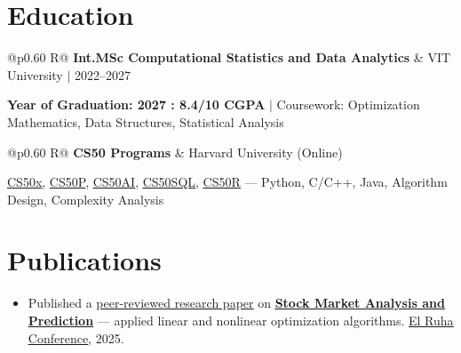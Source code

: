 \documentclass[a4paper,10pt]{article}
\newcommand{\ulink}[2]{\href{#1}{\uline{#2}}}
\newcommand{\subheading}[1]{{\color[HTML]{0A0A0A}\fontsize{12}{14}\selectfont\bfseries #1}}
\newcommand{\meta}[1]{{\color[HTML]{5C5C5C}\fontsize{10.5}{12.5}\selectfont #1}}
\begin{document}
\vspace{2pt}

\section{Education}
\vspace{2pt}

\begin{tabularx}{\linewidth}{@{}p{0.60\linewidth} R@{}}
\subheading{Int.MSc Computational Statistics and Data Analytics} & \meta{VIT University $|$ 2022--2027}
\end{tabularx}
\vspace{1pt}
{\color[HTML]{3A3A3A}\fontsize{11}{14}\selectfont \textbf{Year of Graduation: 2027 : 8.4/10 CGPA} $|$ Coursework: Optimization Mathematics, Data Structures, Statistical Analysis}

\begin{tabularx}{\linewidth}{@{}p{0.60\linewidth} R@{}}
\subheading{CS50 Programs} & \meta{Harvard University (Online)}
\end{tabularx}
\vspace{1pt}
{\color[HTML]{3A3A3A}\fontsize{11}{14}\selectfont \ulink{https://cs50.harvard.edu/certificates/b14b78df-e05c-413e-a607-1dd27303053a}{CS50x}, \ulink{https://cs50.harvard.edu/certificates/32477052-9db4-49c4-a5a4-d7e58429ca2c}{CS50P}, \ulink{https://cs50.harvard.edu/certificates/9cdb4d4a-1250-4f8e-9fd7-191864e0f919}{CS50AI}, \ulink{https://cs50.harvard.edu/certificates/bc486f24-f085-4e61-8536-80940b97a1b9}{CS50SQL}, \ulink{https://cs50.harvard.edu/certificates/666838e6-a053-4d82-b179-a60fe745fd84}{CS50R} --- Python, C/C++, Java, Algorithm Design, Complexity Analysis}

\vspace{2pt}

\section{Publications}
\vspace{2pt}
\begin{itemize}[nosep, leftmargin=1.5em, itemsep=1pt, topsep=2pt]
  \item {\color[HTML]{0A0A0A}\fontsize{11}{14}\selectfont
  Published a \ulink{https://www.elruha.org/_files/ugd/614b1f_6b95e1b697bf452b9907ba46e0151c05.pdf\#page=774}{peer-reviewed research paper} on \ulink{https://github.com/su-jin1425/Set-Project}{\textbf{Stock Market Analysis and Prediction}} --- applied linear and nonlinear optimization algorithms. \ulink{https://www.elruha.org/congress-books}{El Ruha Conference}, 2025.}
\end{itemize}
\end{document}
